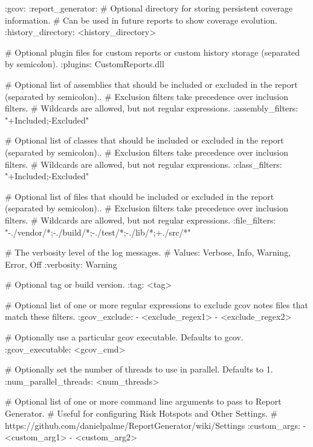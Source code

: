 \begin{DoxyCode}
:gcov:
  :report\_generator:
    # Optional directory for storing persistent coverage information.
    # Can be used in future reports to show coverage evolution.
    :history\_directory: <history\_directory>

    # Optional plugin files for custom reports or custom history storage (separated by semicolon).
    :plugins: CustomReports.dll

    # Optional list of assemblies that should be included or excluded in the report (separated by
       semicolon)..
    # Exclusion filters take precedence over inclusion filters.
    # Wildcards are allowed, but not regular expressions.
    :assembly\_filters: "+Included;-Excluded"

    # Optional list of classes that should be included or excluded in the report (separated by semicolon)..
    # Exclusion filters take precedence over inclusion filters.
    # Wildcards are allowed, but not regular expressions.
    :class\_filters: "+Included;-Excluded"

    # Optional list of files that should be included or excluded in the report (separated by semicolon)..
    # Exclusion filters take precedence over inclusion filters.
    # Wildcards are allowed, but not regular expressions.
    :file\_filters: "-./vendor/*;-./build/*;-./test/*;-./lib/*;+./src/*"

    # The verbosity level of the log messages.
    # Values: Verbose, Info, Warning, Error, Off
    :verbosity: Warning

    # Optional tag or build version.
    :tag: <tag>

    # Optional list of one or more regular expressions to exclude gcov notes files that match these
       filters.
    :gcov\_exclude:
      - <exclude\_regex1>
      - <exclude\_regex2>

    # Optionally use a particular gcov executable. Defaults to gcov.
    :gcov\_executable: <gcov\_cmd>

    # Optionally set the number of threads to use in parallel. Defaults to 1.
    :num\_parallel\_threads: <num\_threads>

    # Optional list of one or more command line arguments to pass to Report Generator.
    # Useful for configuring Risk Hotspots and Other Settings.
    # https://github.com/danielpalme/ReportGenerator/wiki/Settings
    :custom\_args:
      - <custom\_arg1>
      - <custom\_arg2>
\end{DoxyCode}


